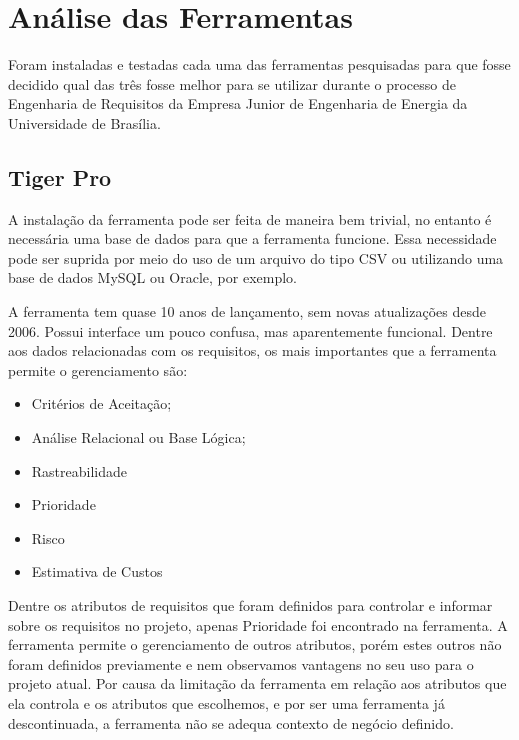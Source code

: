 \section[Análise das Ferramentas]{Análise das Ferramentas}
Foram instaladas e testadas cada uma das ferramentas pesquisadas para que fosse decidido qual das três fosse melhor para se utilizar durante o processo de Engenharia de Requisitos da Empresa Junior de Engenharia de Energia da Universidade de Brasília.

\subsection{Tiger Pro}
A instalação da ferramenta pode ser feita de maneira bem trivial, no entanto é necessária uma base de dados para que a ferramenta funcione. Essa necessidade pode ser suprida por meio do uso de um arquivo do tipo CSV ou utilizando uma base de dados MySQL ou Oracle, por exemplo.

A ferramenta tem quase 10 anos de lançamento, sem novas atualizações desde 2006. Possui interface um pouco confusa, mas aparentemente funcional. Dentre aos dados relacionadas com os requisitos, os mais importantes que a ferramenta permite o gerenciamento são:
\begin{itemize}
  \item Critérios de Aceitação;
  \item Análise Relacional ou Base Lógica;
  \item Rastreabilidade
  \item Prioridade
  \item Risco
  \item Estimativa de Custos
\end{itemize}

Dentre os atributos de requisitos que foram definidos para controlar e informar sobre os requisitos no projeto, apenas Prioridade foi encontrado na ferramenta. A ferramenta permite o gerenciamento de outros atributos, porém estes outros não foram definidos previamente e nem observamos vantagens no seu uso para o projeto atual. Por causa da limitação da ferramenta em relação aos atributos que ela controla e os atributos que escolhemos, e por ser uma ferramenta já descontinuada, a ferramenta não se adequa contexto de negócio definido.

